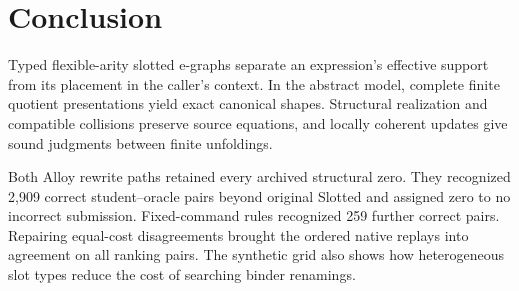 \section{Conclusion}
\label{sec:conclusion}

Typed flexible-arity slotted e-graphs separate an expression's effective
support from its placement in the caller's context. In the abstract model,
complete finite quotient presentations yield exact canonical shapes.
Structural realization and compatible collisions preserve source equations,
and locally coherent updates give sound judgments between finite unfoldings.

Both Alloy rewrite paths retained every archived structural zero. They
recognized 2,909 correct student--oracle pairs beyond original Slotted and
assigned zero to no incorrect submission. Fixed-command rules recognized
259 further correct pairs. Repairing \replayOriginalFailures{} equal-cost
disagreements brought the ordered native replays into agreement on all
\replayPairs{} ranking pairs. The synthetic grid also shows how heterogeneous
slot types reduce the cost of searching binder renamings.

\label{end:main-text}

